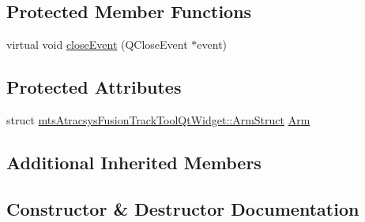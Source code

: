 \subsection*{Protected Member Functions}
\begin{DoxyCompactItemize}
\item 
virtual void \hyperlink{classmts_atracsys_fusion_track_tool_qt_widget_adc821cf1240aef06ba6889adfc6bd9a7}{close\+Event} (Q\+Close\+Event $\ast$event)
\end{DoxyCompactItemize}
\subsection*{Protected Attributes}
\begin{DoxyCompactItemize}
\item 
struct \hyperlink{structmts_atracsys_fusion_track_tool_qt_widget_1_1_arm_struct}{mts\+Atracsys\+Fusion\+Track\+Tool\+Qt\+Widget\+::\+Arm\+Struct} \hyperlink{classmts_atracsys_fusion_track_tool_qt_widget_ac53a93938de07f0aa1158d87fdae4213}{Arm}
\end{DoxyCompactItemize}
\subsection*{Additional Inherited Members}


\subsection{Constructor \& Destructor Documentation}
\hypertarget{classmts_atracsys_fusion_track_tool_qt_widget_ad2cf469f72fc7b248eb96c2ab9395daa}{}

